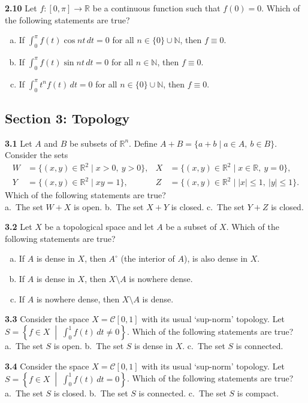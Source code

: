 \documentclass[11pt,a4paper]{article}
\newcommand{\N}{\mathbb{N}}
\newcommand{\R}{\mathbb{R}}
\newcommand{\examsec}[1]{%
  \subsection*{#1}
  \vspace{-2pt}
}
\newcommand{\qitem}[1]{\par\medskip\noindent\textbf{#1}\hspace{0.5em}}
\begin{document}
\qitem{2.10} Let $f : [0, \pi] \to \R$ be a continuous function such that $f(0) = 0$. Which of the following statements are true?
\begin{enumerate}[a.]
  \item If $\int_0^{\pi} f(t)\cos nt\,dt = 0$ for all $n \in \{0\} \cup \N$, then $f \equiv 0$.
  \item If $\int_0^{\pi} f(t)\sin nt\,dt = 0$ for all $n \in \N$, then $f \equiv 0$.
  \item If $\int_0^{\pi} t^n f(t)\,dt = 0$ for all $n \in \{0\} \cup \N$, then $f \equiv 0$.
\end{enumerate}

\examsec{Section 3: Topology}

\qitem{3.1} Let $A$ and $B$ be subsets of $\R^n$. Define $A + B = \{a + b \mid a \in A,\ b \in B\}$. Consider the sets
\begin{align*}
  W &= \{(x, y) \in \R^2 \mid x > 0,\ y > 0\}, & X &= \{(x, y) \in \R^2 \mid x \in \R,\ y = 0\}, \\
  Y &= \{(x, y) \in \R^2 \mid xy = 1\}, & Z &= \{(x, y) \in \R^2 \mid |x| \le 1,\ |y| \le 1\}.
\end{align*}
Which of the following statements are true?\\
a.\ The set $W + X$ is open. \qquad b.\ The set $X + Y$ is closed. \qquad c.\ The set $Y + Z$ is closed.

\qitem{3.2} Let $X$ be a topological space and let $A$ be a subset of $X$. Which of the following statements are true?
\begin{enumerate}[a.]
  \item If $A$ is dense in $X$, then $A^\circ$ (the interior of $A$), is also dense in $X$.
  \item If $A$ is dense in $X$, then $X \setminus A$ is nowhere dense.
  \item If $A$ is nowhere dense, then $X \setminus A$ is dense.
\end{enumerate}

\qitem{3.3} Consider the space $X = \mathcal{C}[0, 1]$ with its usual `sup-norm' topology. Let $S = \left\{f \in X \;\middle|\; \int_0^1 f(t)\,dt \neq 0\right\}$. Which of the following statements are true?\\
a.\ The set $S$ is open. \qquad b.\ The set $S$ is dense in $X$. \qquad c.\ The set $S$ is connected.

\qitem{3.4} Consider the space $X = \mathcal{C}[0, 1]$ with its usual `sup-norm' topology. Let $S = \left\{f \in X \;\middle|\; \int_0^1 f(t)\,dt = 0\right\}$. Which of the following statements are true?\\
a.\ The set $S$ is closed. \qquad b.\ The set $S$ is connected. \qquad c.\ The set $S$ is compact.
\end{document}
